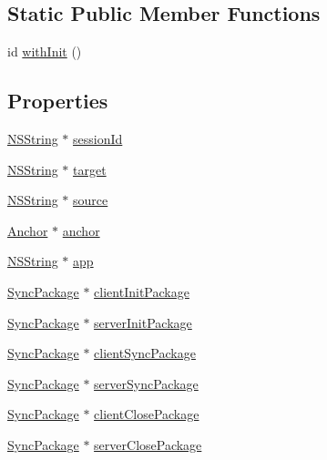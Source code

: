 \subsection*{\-Static \-Public \-Member \-Functions}
\begin{DoxyCompactItemize}
\item 
id \hyperlink{interface_session_a35fc96f2e86052070152638b1f4a1af1}{with\-Init} ()
\end{DoxyCompactItemize}
\subsection*{\-Properties}
\begin{DoxyCompactItemize}
\item 
\hyperlink{class_n_s_string}{\-N\-S\-String} $\ast$ \hyperlink{interface_session_a6d5756ab4187b004fdf35fec171d9cd6}{session\-Id}
\item 
\hyperlink{class_n_s_string}{\-N\-S\-String} $\ast$ \hyperlink{interface_session_ac083c319c715c0109b43548677889524}{target}
\item 
\hyperlink{class_n_s_string}{\-N\-S\-String} $\ast$ \hyperlink{interface_session_aa5b52d84401afe540434bd1b284919dc}{source}
\item 
\hyperlink{interface_anchor}{\-Anchor} $\ast$ \hyperlink{interface_session_aa00ac4bd991eccfa1e7326deaeb7986b}{anchor}
\item 
\hyperlink{class_n_s_string}{\-N\-S\-String} $\ast$ \hyperlink{interface_session_ac5daf9d3a0d566f529feeacf34783d56}{app}
\item 
\hyperlink{interface_sync_package}{\-Sync\-Package} $\ast$ \hyperlink{interface_session_a2e518aa45a8fa466ab2ec6ec85f3bb3c}{client\-Init\-Package}
\item 
\hyperlink{interface_sync_package}{\-Sync\-Package} $\ast$ \hyperlink{interface_session_a2bdb51676f7a0c30a1387410ec359d08}{server\-Init\-Package}
\item 
\hyperlink{interface_sync_package}{\-Sync\-Package} $\ast$ \hyperlink{interface_session_a675633bbcd3aa99bdf612afc32c11c3e}{client\-Sync\-Package}
\item 
\hyperlink{interface_sync_package}{\-Sync\-Package} $\ast$ \hyperlink{interface_session_abbb4409f891ca061a101a5b63e08614c}{server\-Sync\-Package}
\item 
\hyperlink{interface_sync_package}{\-Sync\-Package} $\ast$ \hyperlink{interface_session_abfb958d97d222447044fb08a6b2361ad}{client\-Close\-Package}
\item 
\hyperlink{interface_sync_package}{\-Sync\-Package} $\ast$ \hyperlink{interface_session_a421b6163f73cb82d5bfdb89bc10cdbca}{server\-Close\-Package}

\end{DoxyCompactItemize}
